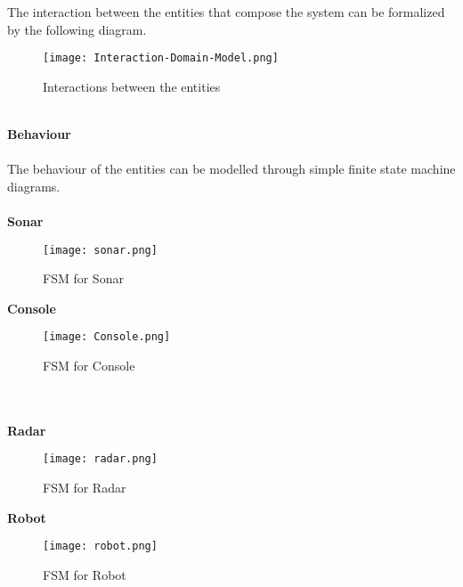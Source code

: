 The interaction between the entities that compose the system can be formalized by the following diagram.
\begin{figure}[h]
	\centering
	\texttt{[image: Interaction-Domain-Model.png]}
	\caption{Interactions between the entities}
\end{figure}
\\\textbf{Behaviour} \\\\
The behaviour of the entities can be modelled through simple finite state machine diagrams.
\\\\
\textbf{Sonar}
\begin{figure}[h]
	\centering
	\texttt{[image: sonar.png]}
	\caption{FSM for Sonar}
\end{figure}
\clearpage
\textbf{Console}
\begin{figure}[h]
	\centering
	\texttt{[image: Console.png]}
	\caption{FSM for Console}
\end{figure}
\\\\
\textbf{Radar}
\begin{figure}[h]
	\centering
	\texttt{[image: radar.png]}
	\caption{FSM for Radar}
\end{figure}
\clearpage
\textbf{Robot}
\begin{figure}[h]
	\centering
	\texttt{[image: robot.png]}
	\caption{FSM for Robot}
\end{figure}